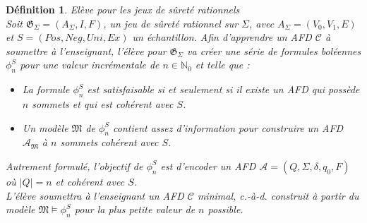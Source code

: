 \documentclass[12pt,a4paper,oneside,titlepage]{report}
\newtheorem{defi}{D\'efinition}[section]
\begin{document}
\begin{defi}{Elève pour les jeux de sûreté rationnels\\}
\label{learner}
Soit $\mathfrak{G}_\Sigma=(A_\Sigma, I, F)$, un jeu de sûreté rationnel sur $\Sigma$, avec $A_\Sigma=(V_0,V_1,E)$ et $S=(Pos,Neg,Uni,Ex)$ un échantillon. Afin d'apprendre un AFD $\mathcal{C}$ à soumettre à l'enseignant, l'élève pour $\mathfrak{G}_\Sigma$ va créer une série de formules boléennes $\phi^S_n$ pour une valeur incrémentale de $n\in\mathbb{N}_0$ et telle que :
\begin{itemize}
\item La formule $\phi^S_n$ est satisfaisable si et seulement si il existe un AFD qui possède $n$ sommets et qui est cohérent avec $S$.
\item Un modèle $\mathfrak{M}$ de $\phi^S_n$ contient assez d'information pour construire un AFD $\mathcal{A}_\mathfrak{M}$ à $n$ sommets cohérent avec $S$.
\end{itemize}
\noindent Autrement formulé, l'objectif de $\phi^S_n$ est d'encoder un AFD $\mathcal{A}=(Q,\Sigma,\delta,q_0,F)$ où $|Q|=n$ et cohérent avec $S$.\\
L'élève soumettra à l'enseignant un AFD $\mathcal{C}$ minimal, c.-à-d. construit à partir du modèle $\mathfrak{M}\models \phi_n^S$ pour la plus petite valeur de $n$ possible.
\end{defi}
\end{document}
